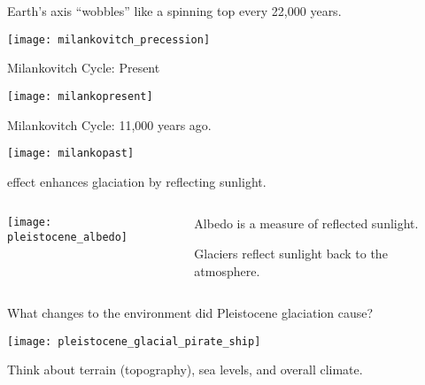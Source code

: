 \documentclass[t]{beamer}
\begin{document}
\begin{frame}{ Earth’s axis “wobbles” like a spinning top every 22,000 years.}
	\begin{center}
		\texttt{[image: milankovitch\_precession]}
	\end{center}
\end{frame}

\begin{frame}{Milankovitch Cycle: Present}
	\begin{center}
		\texttt{[image: milankopresent]}
	\end{center}
\end{frame}

\begin{frame}{Milankovitch Cycle: 11,000 years ago.}
	\begin{center}
		\texttt{[image: milankopast]}
	\end{center}
\end{frame}

\begin{frame}{ effect enhances glaciation by reflecting sunlight.}
	\begin{columns}[T]
		\begin{column}{0.5\textwidth}
			\begin{center}
				\texttt{[image: pleistocene\_albedo]}
			\end{center}
		\end{column}
		\begin{column}{0.45\textwidth}
			\hangpara Albedo is a measure of reflected sunlight. 
			
			\hangpara Glaciers reflect sunlight back to the atmosphere. 
		\end{column}
	\end{columns}
\end{frame}

\begin{frame}{What changes to the environment did Pleistocene glaciation cause? }
		\vspace{-\baselineskip}
		\begin{center}
			\texttt{[image: pleistocene\_glacial\_pirate\_ship]}
		\end{center}
		\vspace{-\baselineskip}
		\qquad Think about terrain (topography), sea levels, and overall climate.
\end{frame}
\end{document}
